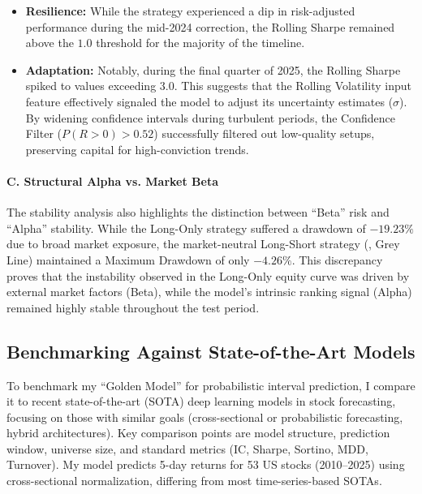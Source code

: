 \documentclass[twoside,final]{hcmut-report}
\newcommand{\result}[1]{\fcolorbox{red}{white}{#1}}
\begin{document}
\begin{itemize}
  \item \textbf{Resilience:} While the strategy experienced a dip in risk-adjusted performance during the mid-2024 correction, the Rolling Sharpe remained above the $1.0$ threshold for the majority of the timeline.
  \item \textbf{Adaptation:} Notably, during the final quarter of 2025, the Rolling Sharpe spiked to values exceeding $3.0$. This suggests that the Rolling Volatility input feature effectively signaled the model to adjust its uncertainty estimates ($\sigma$). By widening confidence intervals during turbulent periods, the Confidence Filter ($P(R>0)>0.52$) successfully filtered out low-quality setups, preserving capital for high-conviction trends.
\end{itemize}

\paragraph{C. Structural Alpha vs. Market Beta}
The stability analysis also highlights the distinction between ``Beta'' risk and ``Alpha'' stability. While the Long-Only strategy suffered a drawdown of $-19.23\%$ due to broad market exposure, the market-neutral Long-Short strategy (\result{Figure~\ref{long_vs_long-short}}, Grey Line) maintained a Maximum Drawdown of only $-4.26\%$. This discrepancy proves that the instability observed in the Long-Only equity curve was driven by external market factors (Beta), while the model's intrinsic ranking signal (Alpha) remained highly stable throughout the test period.

\subsection{Benchmarking Against State-of-the-Art Models}
To benchmark my ``Golden Model'' for probabilistic interval prediction, I compare it to recent state-of-the-art (SOTA) deep learning models in stock forecasting, focusing on those with similar goals (cross-sectional or probabilistic forecasting, hybrid architectures). Key comparison points are model structure, prediction window, universe size, and standard metrics (IC, Sharpe, Sortino, MDD, Turnover). My model predicts 5-day returns for 53 US stocks (2010--2025) using cross-sectional normalization, differing from most time-series-based SOTAs.
\end{document}
